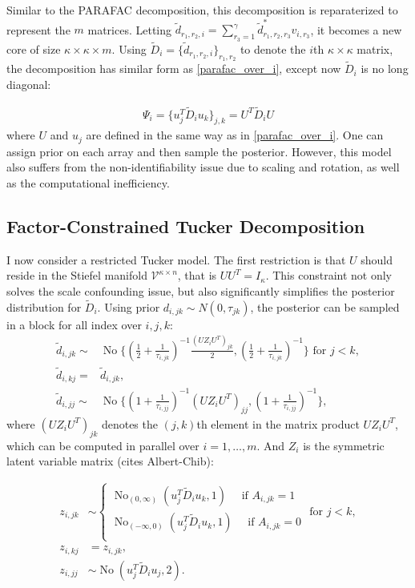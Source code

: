 \documentclass[10pt]{article}
\newcommand{\be}{\begin{equation}\begin{aligned}}
\newcommand{\ee}{\end{aligned}\end{equation}}
\newcommand{\mc}[1]{\mathcal{#1}}
\DeclareMathOperator{\No}{No}
\begin{document}
Similar to the PARAFAC decomposition, this decomposition is reparaterized to represent the $m$ matrices. Letting $\tilde d_{r_1,r_2,i}=\sum_{r_3=1}^{\gamma}\tilde d^*_{r_1,r_2, r_3}v_{i, r_3}$, it becomes a new core of size $\kappa \times \kappa \times m$. Using $\tilde D_i = \{\tilde d_{r_1,r_2,i}\}_{r_1,r_2}$ to denote the $i$th $\kappa \times \kappa$ matrix, the decomposition has similar form as \eqref{parafac_over_i}, except now $\tilde D_{i}$ is no long diagonal:

\be
\Psi_{i}= \{ u_{j}^T  \tilde D_{i} u_{k}\}_{j,k} = U^T \tilde D_iU
\ee
where $U$ and $u_{j}$ are defined in the same way as in \eqref{parafac_over_i}. One can assign prior on each array and then sample the posterior. However, this model also suffers from the non-identifiability issue due to scaling and rotation, as well as the computational inefficiency.

\subsection{Factor-Constrained Tucker Decomposition}

I now consider  a restricted Tucker model. The first restriction is that $U$ should reside in the Stiefel manifold $\mc V^{\kappa \times n}$, that is $U U^T = I_\kappa$. This constraint not only solves the scale confounding issue, but also significantly simplifies the posterior distribution for $\tilde D_{i}$. Using prior $d_{i,jk}\sim N(0, \tau_{jk})$, the posterior can be sampled in a block for all index over $i,j,k$:
\be
\tilde d_{i,jk} \sim& \No\{    (\frac{1}{2}+ \frac{1}{\tau_{i,jk}})^{-1} \frac{(UZ_iU^T)_{jk}}{2} ,(\frac{1}{2}+ \frac{1}{\tau_{i,jk}})^{-1}\} \text { for } j<k, \\
\tilde d_{i,kj} =& \tilde d_{i,jk} ,\\
\tilde d_{i,jj} \sim & \No\{    ({1}+ \frac{1}{\tau_{i,jj}})^{-1} (UZ_iU^T)_{jj}, ({1}+ \frac{1}{\tau_{i,jj}})^{-1} \},
\ee
where $(UZ_iU^T)_{jk}$ denotes the $(j,k)$th element in the matrix product $UZ_iU^T$, which can be computed in parallel over $i=1,\ldots, m$.
 And $Z_i$ is the symmetric latent variable matrix (cites Albert-Chib):

\be
z_{i,jk}&\sim \left\{ \begin{array}{cc} 
\No_{(0,\infty)}(u_{j}^T  \tilde D_{i} u_{k},1) \quad \text{ if } A_{i,jk}=1\\
\No_{(-\infty,0)}(u_{j}^T  \tilde D_{i} u_{k},1)\quad \text{ if } A_{i,jk}=0\\
\end{array} \text { for } j<k \right.,\\
z_{i,kj}& = z_{i,jk},\\
z_{i,jj}&\sim\No(u_{j}^T  \tilde D_{i} u_{j},2).\\
\ee
\end{document}
